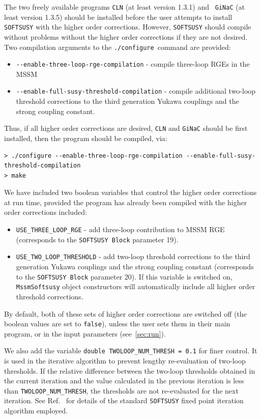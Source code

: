 \documentclass[final,3p,times,pdflatex]{elsarticle}
\def\code#1{{\tt #1}}
\begin{document}
The two freely available programs {\tt CLN} (at least version 1.3.1) and {\tt
  GiNaC} (at least version 1.3.5) should be installed before the user attempts
to install {\tt SOFTSUSY} with the higher order corrections. However, 
{\tt SOFTSUSY} should compile without problems without the higher order
corrections if they are not desired. 
Two compilation arguments to the {\tt ./configure}~command are provided:
\begin{itemize}
	\item[] \verb|--enable-three-loop-rge-compilation| - compile three-loop RGEs in the MSSM 
	\item[] \verb|--enable-full-susy-threshold-compilation| - compile
          additional two-loop threshold corrections to the third generation
          Yukawa couplings and the strong coupling constant.
\end{itemize}
Thus, if all higher order corrections are desired, {\tt CLN} and {\tt GiNaC}
should be first installed, then 
the program should be
compiled, via:
\begin{verbatim}
> ./configure --enable-three-loop-rge-compilation --enable-full-susy-threshold-compilation
> make
\end{verbatim}

We have included two boolean variables that control the higher order
corrections  at run time, provided the program has already been compiled with 
the higher order corrections included:
\begin{itemize}
	\item \verb|USE_THREE_LOOP_RGE|  - add three-loop contribution to
          MSSM RGE (corresponds to the \code{SOFTSUSY Block} parameter 19). 
	\item \verb|USE_TWO_LOOP_THRESHOLD| - add two-loop threshold
          corrections to the third generation Yukawa couplings and the strong
          coupling constant 
          (corresponds to the \code{SOFTSUSY Block} parameter 20). If this
          variable is switched on, {\tt MssmSoftsusy} object constructors will 
          automatically include all higher order threshold corrections.
\end{itemize}
By default, both of these sets of higher order corrections are switched off 
(the boolean values are set to {\tt false}), unless the user sets them in
their main program, or in the input parameters (see~\ref{sec:run}). 

We also add the variable
\verb|double TWOLOOP_NUM_THRESH = 0.1| for finer control. It is 
          used in the iterative 
          algorithm to prevent lengthy re-evaluation of two-loop thresholds.
          If the relative difference between the two-loop thresholds obtained
          in the 
          current iteration and the value calculated in the previous
          iteration is less than
          \verb|TWOLOOP_NUM_THRESH|, the thresholds are not 
          re-evaluated for
          the next iteration.  
          See Ref.~\cite{Allanach:2001kg} for
          details of the standard {\tt SOFTSUSY} fixed point iteration 
          algorithm employed.
        
\end{document}
